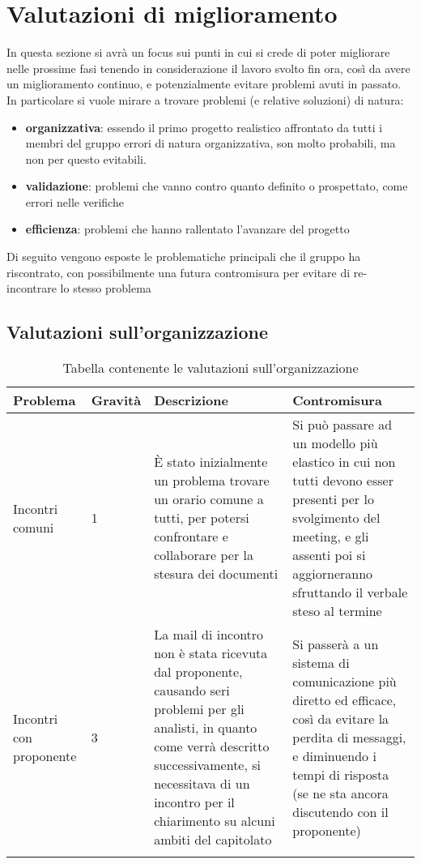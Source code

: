 
\section{Valutazioni di miglioramento}
	In questa sezione si avrà un focus sui punti in cui si crede di poter migliorare nelle prossime fasi tenendo in considerazione il lavoro svolto fin ora, così da avere un miglioramento continuo, e potenzialmente evitare problemi avuti in passato.
	In particolare si vuole mirare a trovare problemi (e relative soluzioni) di natura:
	\begin{itemize}	
		\item\textbf{organizzativa}: essendo il primo progetto realistico affrontato da tutti i membri del gruppo errori di natura organizzativa, son molto probabili, ma non per questo evitabili.
		\item\textbf{validazione}: problemi che vanno contro quanto definito o prospettato, come errori nelle verifiche
		\item\textbf{efficienza}: problemi che hanno rallentato l'avanzare del progetto
	\end{itemize}
	Di seguito vengono esposte le problematiche principali che il gruppo ha riscontrato, con possibilmente una futura contromisura per evitare di re-incontrare lo stesso problema
	
	
	\subsection{Valutazioni sull'organizzazione}
		\begin{center}
			\begin{longtable}{|p{3cm}|p{1.5cm}|p{4cm}|p{4cm}|}
			\hline
			\rowcolor{lighter-grayer}
			\textbf{Problema} &  \textbf{Gravità} &  \textbf{Descrizione} & \textbf{Contromisura}\\
			\hline
			\endfirsthead
			\hline
			Incontri comuni
			&
			1
			&
			È stato inizialmente un problema trovare un orario comune a tutti, per potersi confrontare e collaborare per la stesura dei documenti
	  		&
			Si può passare ad un modello più elastico in cui non tutti devono esser presenti per lo svolgimento del meeting, e gli assenti poi si aggiorneranno sfruttando il verbale steso al termine \\
			\hline
			
			Incontri con proponente
			&
			3
			&
			La mail di incontro non è stata ricevuta dal proponente, causando seri problemi per gli analisti, in quanto come verrà descritto successivamente, si necessitava di un incontro per il chiarimento su alcuni ambiti del capitolato
	  		&
			Si passerà a un sistema di comunicazione più diretto ed efficace, così da evitare la perdita di messaggi, e diminuendo i tempi di risposta (se ne sta ancora discutendo con il proponente) \\
			\hline
			
			
			
			\rowcolor{white}
			\caption{Tabella contenente le valutazioni sull'organizzazione}
			\end{longtable}
		\end{center}

